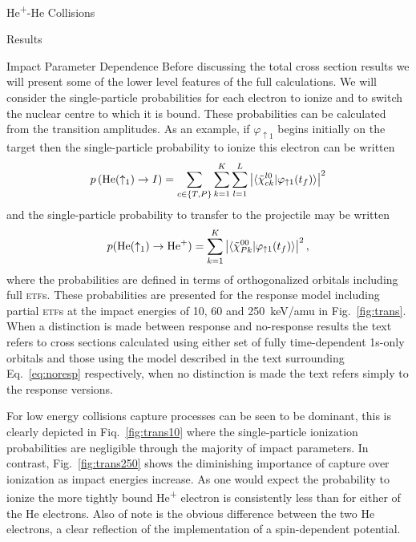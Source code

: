 \documentclass[letterpaper, 11 pt]{report}
\begin{document}
\begin{chapter}{\texorpdfstring{He\textsuperscript{+}}{He+}-He Collisions \label{chap:hephe}}
\begin{section}{Results \label{sec:hephe-disc}}
\begin{subsection}{Impact Parameter Dependence}
         Before discussing the total cross section results we will present some of the lower level
         features of the full calculations. We will consider the single-particle probabilities for each
         electron to ionize and to switch the nuclear centre to which it is bound. These probabilities
         can be calculated from the transition amplitudes. As an example, if $\varphi_{\uparrow 1}$
         begins initially on the target then the single-particle probability to ionize this electron can
         be written
         \begin{equation} \label{eq:ionprob}
            p \left( \mathrm{He}(\uparrow_1) \rightarrow I \right) =
               \sum\limits_{c \in \{T,P\}} \sum\limits_{k=1}^K \sum\limits_{l = 1}^L
               \left| \braket{ \tilde{\chi}^{l0}_{c k} | \varphi_{\uparrow 1}(t_f)} \right|^2
         \end{equation}
         and the single-particle probability to transfer to the projectile may be written
         \begin{equation} \label{eq:transprob}
            p(\mathrm{He}(\uparrow_1) \rightarrow \mathrm{He}^+) =
               \sum\limits_{k=1}^K \left| \braket{ \tilde{\chi}^{00}_{P k} | \varphi_{\uparrow 1}(t_f)}
                          \right|^2,
         \end{equation}
         where the probabilities are defined in terms of orthogonalized orbitals including full
         \textsc{etf}s. These probabilities are presented for the response model including partial
         \textsc{etf}s at the impact energies of 10, 60 and 250~keV/amu in Fig.~\ref{fig:trans}. When a
         distinction is made between response and no-response results the text refers to cross sections
         calculated using either set of fully time-dependent 1s-only orbitals and those using the model
         described in the text surrounding Eq.~\eqref{eq:noresp} respectively, when no distinction is
         made the text refers simply to the response versions.

         For low energy collisions capture processes can be seen to be dominant, this is clearly
         depicted in Fiq.~\ref{fig:trans10} where the single-particle ionization probabilities are
         negligible through the majority of impact parameters. In contrast, Fig.~\ref{fig:trans250}
         shows the diminishing importance of capture over ionization as impact energies increase.
         As one would expect the probability to ionize the more tightly bound He\textsuperscript{+}
         electron is consistently less than for either of the He electrons. Also of note is the obvious
         difference between the two He electrons, a clear reflection of the implementation of a
         spin-dependent potential.


\end{subsection}
\end{section}
\end{chapter}
\end{document}
